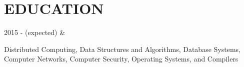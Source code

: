 \documentclass[]{richard-dang}
\begin{document}
\section*{\faMortarBoard \hspace{\FAspace} EDUCATION}
\medbreak
\begin{tabularcv}
    2015 -  (expected)   &   
                    \begin{tabitemize}
                        \item Distributed Computing, Data Structures and Algorithms, Database Systems, Computer Networks, Computer Security, Operating Systems, and Compilers 
                    \end{tabitemize} 

\end{tabularcv}
\end{document}
